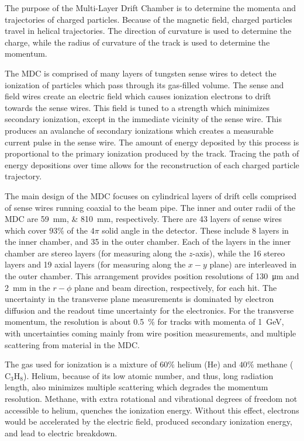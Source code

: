 The purpose of the Multi-Layer Drift Chamber is to determine the momenta and trajectories of charged particles.
Because of the magnetic field, charged particles travel in helical trajectories.
The direction of curvature is used to determine the charge, while the radius of curvature of the track is used to determine the momentum.


The MDC is comprised of many layers of tungsten sense wires to detect the ionization of particles which pass through its gas-filled volume.
The sense and field wires create an electric field which causes ionization electrons to drift towards the sense wires.
This field is tuned to a strength which minimizes secondary ionization, except in the immediate vicinity of the sense wire.
This produces an avalanche of secondary ionizations which creates a measurable current pulse in the sense wire.
The amount of energy deposited by this process is proportional to the primary ionization produced by the track.
Tracing the path of energy depositions over time allows for the reconstruction of each charged particle trajectory.


The main design of the MDC focuses on cylindrical layers of drift cells comprised of sense wires running coaxial to the beam pipe.
The inner and outer radii of the MDC are \SIlist{59;810}{\mm}, respectively.
There are 43 layers of sense wires which cover $93\%$ of the $4\pi$ solid angle in the detector.
These include 8 layers in the inner chamber, and 35 in the outer chamber.
Each of the layers in the inner chamber are stereo layers (for measuring along the $z$-axis), while the 16 stereo layers and 19 axial layers (for measuring along the $x-y$ plane) are interleaved in the outer chamber.
This arrangement provides position resolutions of \SI{130}{\um} and \SI{2}{\mm} in the $r-\phi$ plane and beam direction, respectively, for each hit.
The uncertainty in the transverse plane measurements is dominated by electron diffusion and the readout time uncertainty for the electronics.
For the transverse momentum, the resolution is about \SI{0.5}{\%} for tracks with momenta of \SI{1}{\GeV}, with uncertainties coming mainly from wire position measurements, and multiple scattering from material in the MDC.


The gas used for ionization is a mixture of $60 \%$ helium (He) and $40 \%$ methane ($\text{C}_3\text{H}_8$).
Helium, because of its low atomic number, and thus, long radiation length, also minimizes multiple scattering which degrades the momentum resolution.
Methane, with extra rotational and vibrational degrees of freedom not accessible to helium, quenches the ionization energy.
Without this effect, electrons would be accelerated by the electric field, produced secondary ionization energy, and lead to electric breakdown.


